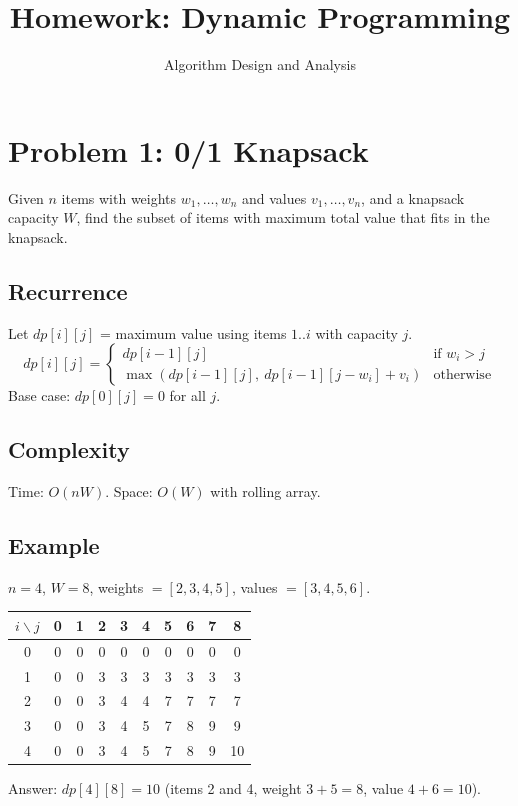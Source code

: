 \documentclass[12pt]{article}
\title{Homework: Dynamic Programming}
\author{Algorithm Design and Analysis}
\date{}
\begin{document}
\maketitle

\section{Problem 1: 0/1 Knapsack}

Given $n$ items with weights $w_1,\ldots,w_n$ and values $v_1,\ldots,v_n$, and a knapsack
capacity $W$, find the subset of items with maximum total value that fits in the knapsack.

\subsection*{Recurrence}
Let $dp[i][j]$ = maximum value using items $1..i$ with capacity $j$.
\[
  dp[i][j] = \begin{cases}
    dp[i-1][j] & \text{if } w_i > j \\
    \max(dp[i-1][j],\ dp[i-1][j-w_i] + v_i) & \text{otherwise}
  \end{cases}
\]
Base case: $dp[0][j] = 0$ for all $j$.

\subsection*{Complexity}
Time: $O(nW)$. Space: $O(W)$ with rolling array.

\subsection*{Example}
$n=4$, $W=8$, weights $= [2,3,4,5]$, values $= [3,4,5,6]$.

\begin{center}
\begin{tabular}{c|ccccccccc}
\toprule
$i \backslash j$ & 0 & 1 & 2 & 3 & 4 & 5 & 6 & 7 & 8 \\
\midrule
0 & 0 & 0 & 0 & 0 & 0 & 0 & 0 & 0 & 0 \\
1 & 0 & 0 & 3 & 3 & 3 & 3 & 3 & 3 & 3 \\
2 & 0 & 0 & 3 & 4 & 4 & 7 & 7 & 7 & 7 \\
3 & 0 & 0 & 3 & 4 & 5 & 7 & 8 & 9 & 9 \\
4 & 0 & 0 & 3 & 4 & 5 & 7 & 8 & 9 & 10 \\
\bottomrule
\end{tabular}
\end{center}
Answer: $dp[4][8] = 10$ (items 2 and 4, weight $3+5=8$, value $4+6=10$).
\end{document}
